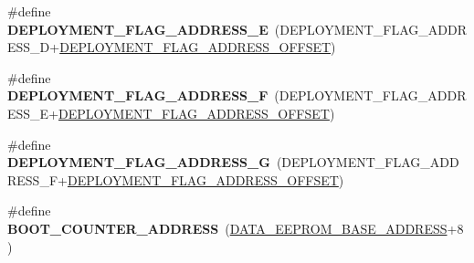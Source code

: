 \begin{DoxyCompactItemize}
\item 
\hypertarget{group__eps__non__volatile__mem__handling_gac3d646a291350cac5db9a6823fa2112d}{\#define {\bfseries D\-E\-P\-L\-O\-Y\-M\-E\-N\-T\-\_\-\-F\-L\-A\-G\-\_\-\-A\-D\-D\-R\-E\-S\-S\-\_\-\-E}~(D\-E\-P\-L\-O\-Y\-M\-E\-N\-T\-\_\-\-F\-L\-A\-G\-\_\-\-A\-D\-D\-R\-E\-S\-S\-\_\-\-D+\hyperlink{group__eps__non__volatile__mem__handling_gac44959ceff397100af805c87122a0de4}{D\-E\-P\-L\-O\-Y\-M\-E\-N\-T\-\_\-\-F\-L\-A\-G\-\_\-\-A\-D\-D\-R\-E\-S\-S\-\_\-\-O\-F\-F\-S\-E\-T})}\label{group__eps__non__volatile__mem__handling_gac3d646a291350cac5db9a6823fa2112d}

\item 
\hypertarget{group__eps__non__volatile__mem__handling_ga8311278baf2d83cd9acdd2d89fc32958}{\#define {\bfseries D\-E\-P\-L\-O\-Y\-M\-E\-N\-T\-\_\-\-F\-L\-A\-G\-\_\-\-A\-D\-D\-R\-E\-S\-S\-\_\-\-F}~(D\-E\-P\-L\-O\-Y\-M\-E\-N\-T\-\_\-\-F\-L\-A\-G\-\_\-\-A\-D\-D\-R\-E\-S\-S\-\_\-\-E+\hyperlink{group__eps__non__volatile__mem__handling_gac44959ceff397100af805c87122a0de4}{D\-E\-P\-L\-O\-Y\-M\-E\-N\-T\-\_\-\-F\-L\-A\-G\-\_\-\-A\-D\-D\-R\-E\-S\-S\-\_\-\-O\-F\-F\-S\-E\-T})}\label{group__eps__non__volatile__mem__handling_ga8311278baf2d83cd9acdd2d89fc32958}

\item 
\hypertarget{group__eps__non__volatile__mem__handling_ga564872794c3d16d7196a97340c09ad42}{\#define {\bfseries D\-E\-P\-L\-O\-Y\-M\-E\-N\-T\-\_\-\-F\-L\-A\-G\-\_\-\-A\-D\-D\-R\-E\-S\-S\-\_\-\-G}~(D\-E\-P\-L\-O\-Y\-M\-E\-N\-T\-\_\-\-F\-L\-A\-G\-\_\-\-A\-D\-D\-R\-E\-S\-S\-\_\-\-F+\hyperlink{group__eps__non__volatile__mem__handling_gac44959ceff397100af805c87122a0de4}{D\-E\-P\-L\-O\-Y\-M\-E\-N\-T\-\_\-\-F\-L\-A\-G\-\_\-\-A\-D\-D\-R\-E\-S\-S\-\_\-\-O\-F\-F\-S\-E\-T})}\label{group__eps__non__volatile__mem__handling_ga564872794c3d16d7196a97340c09ad42}

\item 
\hypertarget{group__eps__non__volatile__mem__handling_ga86dcd7424888240b1555c1c9389421b8}{\#define {\bfseries B\-O\-O\-T\-\_\-\-C\-O\-U\-N\-T\-E\-R\-\_\-\-A\-D\-D\-R\-E\-S\-S}~(\hyperlink{group__eps__non__volatile__mem__handling_gaae76a8f2af728d5113e2cee5f525642c}{D\-A\-T\-A\-\_\-\-E\-E\-P\-R\-O\-M\-\_\-\-B\-A\-S\-E\-\_\-\-A\-D\-D\-R\-E\-S\-S}+8)}\label{group__eps__non__volatile__mem__handling_ga86dcd7424888240b1555c1c9389421b8}


\end{DoxyCompactItemize}
